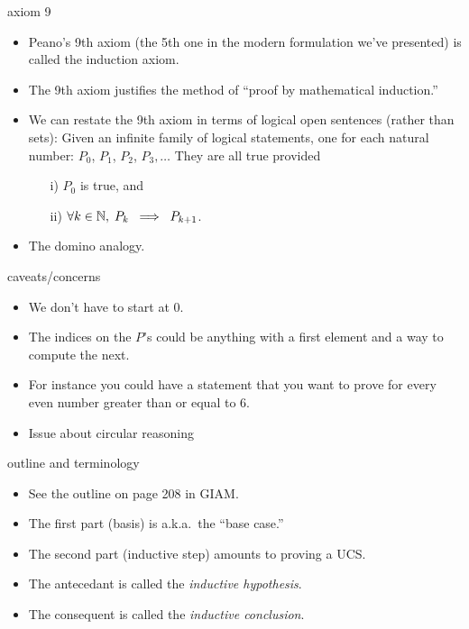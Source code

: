 \documentclass[handout,landscape]{beamer}
\begin{document}
\begin{frame}{axiom 9}
\begin{itemize}
\item Peano's 9th axiom (the 5th one in the modern formulation we've presented) is called the induction axiom. \pause
\item The 9th axiom justifies the method of ``proof by mathematical induction.''  \pause
\item We can restate the 9th axiom in terms of logical open sentences (rather than sets): \pause \newline
Given an infinite family of logical statements, one for each natural number: $P_0$, $P_1$, $P_2$, $P_3, \ldots$ \pause \newline
They are all true provided
\begin{enumerate}
\item[i)] $P_0$ is true, and
\item[ii)]  $\forall k \in {\mathbb N}, \; P_k \; \implies \; P_{k+1}$.
\end{enumerate}
\pause
\item The domino analogy.
\end{itemize}
\end{frame}

\begin{frame}{caveats/concerns}
\begin{itemize}
\item We don't have to start at $0$. \pause
\item The indices on the $P$'s could be anything with a first element and a way to compute the next. \pause
\item For instance you could have a statement that you want to prove for every even number greater than or equal to 6. \pause
\item Issue about circular reasoning
\end{itemize}
\end{frame}

\begin{frame}{outline and terminology}
\begin{itemize}
\item See the outline on page 208 in GIAM. \pause
\item The first part (basis) is a.k.a.\ the ``base case.'' \pause
\item The second part (inductive step) amounts to proving a UCS. \pause
\item The antecedant is called the {\em inductive hypothesis}. \pause
\item The consequent is called the {\em inductive conclusion}.
\end{itemize}
\end{frame}
\end{document}
